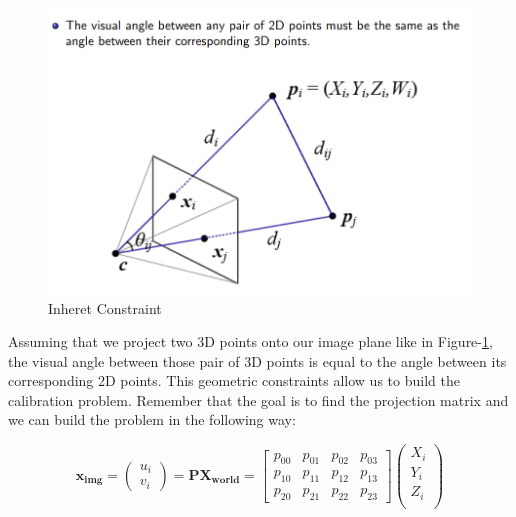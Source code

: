 \documentclass[a4paper]{report}
\numberwithin{figure}{section}
\begin{document}
\begin{figure}[H]
	\centering
  \includegraphics[width=\linewidth,natwidth=640,natheight=640]
  {fig/ref_imgs/calibration_dlt.png}
  \caption{Inheret Constraint}
  \label{fig:calibration_constraint}
\end{figure}


Assuming that we project two 3D points onto our image plane
like in Figure-\ref{fig:calibration_constraint},
the visual angle between those pair of 3D points is equal to 
the angle between its corresponding 2D points. This geometric constraints 
allow us to build the calibration problem. Remember that the goal is to find 
the projection matrix and we can build the problem in the following way:

\begin{equation}
  \mathbf{x_{img}} = 
  \begin{pmatrix}
    u_i\\
    v_i
  \end{pmatrix}
  =
  \mathbf{P}\mathbf{X_{world}} = 
  \begin{bmatrix}
    p_{00} & p_{01} & p_{02} & p_{03}\\
    p_{10} & p_{11} & p_{12} & p_{13}\\
    p_{20} & p_{21} & p_{22} & p_{23}
  \end{bmatrix}
  \begin{pmatrix}
    X_i\\
    Y_i\\
    Z_i\\
  \end{pmatrix}
\end{equation} \label{eq:proj_matrix}
\end{document}
